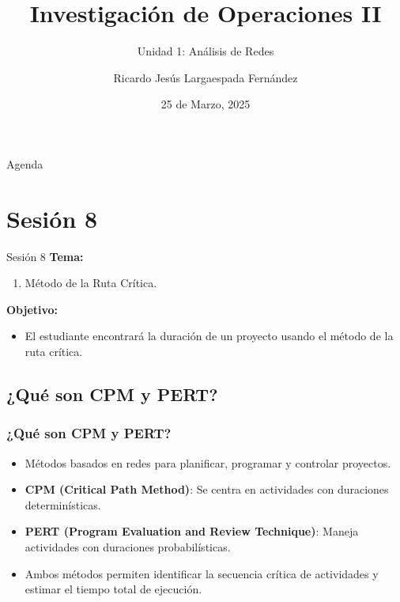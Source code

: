 \documentclass{beamer}
\title{Investigación de Operaciones II}
\subtitle{Unidad 1: Análisis de Redes}
\author{Ricardo Jesús Largaespada Fernández}
\institute{Ingeniería de Sistemas, DACTIC, UNI}
\date{25 de Marzo, 2025}
\begin{document}
\frame{\titlepage}

\begin{frame}{Agenda}
    \tableofcontents
\end{frame}

\section{Sesión 8}

\begin{frame}{Sesión 8}
\textbf{Tema:}
\begin{enumerate}
    \item Método de la Ruta Crítica.
\end{enumerate}

\textbf{Objetivo:}
\begin{itemize}
    \item El estudiante encontrará la duración de un proyecto usando el método de la ruta crítica.
\end{itemize}
\end{frame}

\subsection{¿Qué son CPM y PERT?}
\begin{frame}
\frametitle{¿Qué son CPM y PERT?}

\begin{itemize}
    \item Métodos basados en redes para planificar, programar y controlar proyectos.
    \item \textbf{CPM (Critical Path Method)}: Se centra en actividades con duraciones determinísticas.
    \item \textbf{PERT (Program Evaluation and Review Technique)}: Maneja actividades con duraciones probabilísticas.
    \item Ambos métodos permiten identificar la secuencia crítica de actividades y estimar el tiempo total de ejecución.
\end{itemize}

\end{frame}
\end{document}
